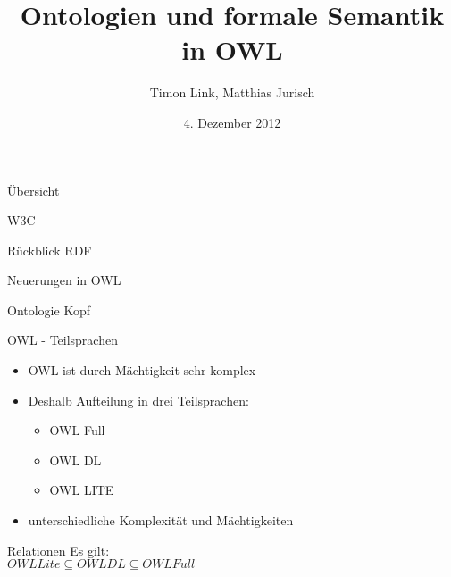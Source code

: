 \documentclass{beamer}
\title[OWL]{Ontologien und formale Semantik in OWL}
\author{Timon Link, Matthias Jurisch}
\date{4. Dezember 2012}
\begin{document}
\begin{frame}
\titlepage
\end{frame}

\begin{frame}{Übersicht}
\end{frame}

\begin{frame}{W3C}
\end{frame}
\begin{frame}{Rückblick RDF}
\end{frame}


\begin{frame}{Neuerungen in OWL}

\end{frame}

\begin{frame}{Ontologie Kopf}

\end{frame}



\begin{frame}{OWL - Teilsprachen}
\begin{itemize}
	\item OWL ist durch Mächtigkeit sehr komplex
	\item Deshalb Aufteilung in drei Teilsprachen:
\begin{itemize}
	\item OWL Full
	\item OWL DL
	\item OWL LITE
\end{itemize}
	\item unterschiedliche Komplexität und Mächtigkeiten
\end{itemize}
\begin{block}{Relationen}
	Es gilt:\\
	$OWL Lite \subseteq OWL DL \subseteq OWL Full$
\end{block}
\end{frame}
\end{document}
